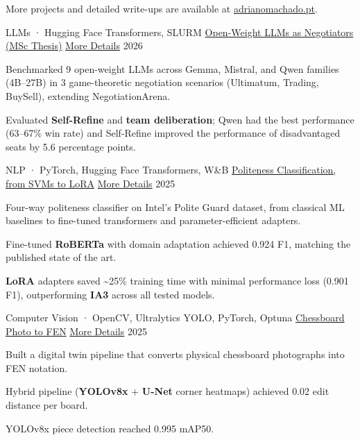 
\begin{cvparagraph}
More projects and detailed write-ups are available at \href{https://adrianomachado.pt}{adrianomachado.pt}.
\end{cvparagraph}

\begin{cventries}

  \cventry
    {LLMs · Hugging Face Transformers, SLURM} %
    {\href{https://www.adrianomachado.pt/work/llm-negotiation}{Open-Weight LLMs as Negotiators (MSc Thesis)}} %
    {\href{https://adrianomachado.pt/work/llm-negotiation}{More Details}} %
    {2026} %
    {
      \begin{cvitems}
        \item {Benchmarked 9 open-weight LLMs across Gemma, Mistral, and Qwen families (4B--27B) in 3 game-theoretic negotiation scenarios (Ultimatum, Trading, BuySell), extending NegotiationArena.}
        \item {Evaluated \textbf{Self-Refine} and \textbf{team deliberation}; Qwen had the best performance (63--67\% win rate) and Self-Refine improved the performance of disadvantaged seats by 5.6 percentage points.}
      \end{cvitems}
    }

  \cventry
    {NLP · PyTorch, Hugging Face Transformers, W\&B} %
    {\href{https://www.adrianomachado.pt/work/politeness-nlp}{Politeness Classification, from SVMs to LoRA}} %
    {\href{https://adrianomachado.pt/work/politeness-nlp}{More Details}} %
    {2025} %
    {
      \begin{cvitems}
        \item {Four-way politeness classifier on Intel's Polite Guard dataset, from classical ML baselines to fine-tuned transformers and parameter-efficient adapters.}
        \item {Fine-tuned \textbf{RoBERTa} with domain adaptation achieved 0.924 F1, matching the published state of the art.}
        \item {\textbf{LoRA} adapters saved \textasciitilde25\% training time with minimal performance loss (0.901 F1), outperforming \textbf{IA3} across all tested models.}
      \end{cvitems}
    }

  \cventry
    {Computer Vision · OpenCV, Ultralytics YOLO, PyTorch, Optuna} %
    {\href{https://www.adrianomachado.pt/work/chess-digital-twin}{Chessboard Photo to FEN}} %
    {\href{https://adrianomachado.pt/work/chess-digital-twin}{More Details}} %
    {2025} %
    {
      \begin{cvitems}
        \item {Built a digital twin pipeline that converts physical chessboard photographs into FEN notation.}
        \item {Hybrid pipeline (\textbf{YOLOv8x} + \textbf{U-Net} corner heatmaps) achieved 0.02 edit distance per board.}
        \item {YOLOv8x piece detection reached 0.995 mAP50.}
      \end{cvitems}
    }

\end{cventries}
